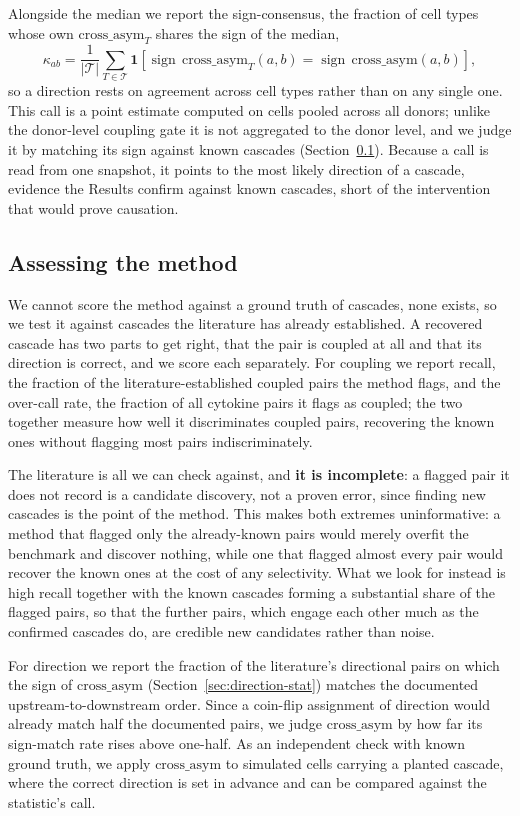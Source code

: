 \documentclass[11pt,a4paper]{article}
\begin{document}
Alongside the median we report the sign-consensus, the fraction of cell types whose own $\mathrm{cross\_asym}_T$ shares the sign of the median,
\[
  \kappa_{ab} = \frac{1}{|\mathcal{T}|}\sum_{T\in\mathcal{T}} \mathbf{1}\!\left[\operatorname{sign}\,\mathrm{cross\_asym}_T(a,b) = \operatorname{sign}\,\mathrm{cross\_asym}(a,b)\right],
\]
so a direction rests on agreement across cell types rather than on any single one.
This call is a point estimate computed on cells pooled across all donors; unlike the donor-level coupling gate it is not aggregated to the donor level, and we judge it by matching its sign against known cascades (Section~\ref{sec:methods-evaluation}).
Because a call is read from one snapshot, it points to the most likely direction of a cascade, evidence the Results confirm against known cascades, short of the intervention that would prove causation.

\subsection{Assessing the method}
\label{sec:methods-evaluation}
We cannot score the method against a ground truth of cascades, none exists, so we test it against cascades the literature has already established.
A recovered cascade has two parts to get right, that the pair is coupled at all and that its direction is correct, and we score each separately.
For coupling we report recall, the fraction of the literature-established coupled pairs the method flags, and the over-call rate, the fraction of all cytokine pairs it flags as coupled; the two together measure how well it discriminates coupled pairs, recovering the known ones without flagging most pairs indiscriminately.

The literature is all we can check against, and \textbf{it is incomplete}: a flagged pair it does not record is a candidate discovery, not a proven error, since finding new cascades is the point of the method.
This makes both extremes uninformative: a method that flagged only the already-known pairs would merely overfit the benchmark and discover nothing, while one that flagged almost every pair would recover the known ones at the cost of any selectivity.
What we look for instead is high recall together with the known cascades forming a substantial share of the flagged pairs, so that the further pairs, which engage each other much as the confirmed cascades do, are credible new candidates rather than noise.

For direction we report the fraction of the literature's directional pairs on which the sign of $\mathrm{cross\_asym}$ (Section~\ref{sec:direction-stat}) matches the documented upstream-to-downstream order.
Since a coin-flip assignment of direction would already match half the documented pairs, we judge $\mathrm{cross\_asym}$ by how far its sign-match rate rises above one-half.
As an independent check with known ground truth, we apply $\mathrm{cross\_asym}$ to simulated cells carrying a planted cascade, where the correct direction is set in advance and can be compared against the statistic's call.
\end{document}
